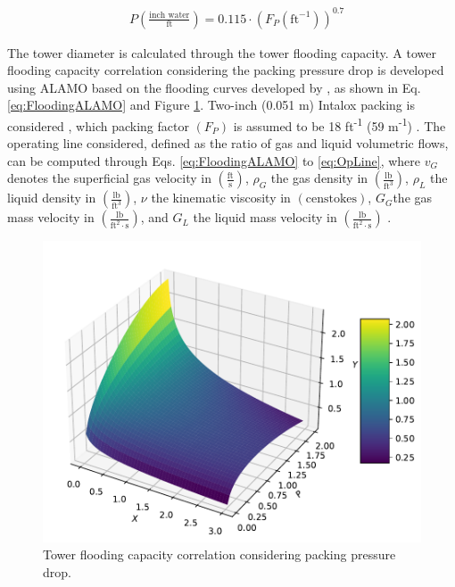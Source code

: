 \begin{refsection}[referencesCh6]

\begin{align}
& P \left(\frac{\text{inch water}}{\text{ft}}\right) = 0.115 \cdot \left( F_{P}  \left(\text{ft}^{-1}\right)\right) ^{0.7} \label{eq:PDrop}
\end{align}

The tower diameter is calculated through the tower flooding capacity. A tower flooding capacity correlation considering the packing pressure drop is developed using ALAMO \citep{wilson2017alamo} based on the flooding curves developed by \citet{strigle1994packed}, as shown in Eq. \ref{eq:FloodingALAMO} and Figure \ref{fig:FloodingALAMO}. Two-inch (0.051 m) Intalox packing is considered \citep{strigle1994packed}, which packing factor $\left(F_P\right)$ is assumed to be 
18 ft\textsuperscript{-1}
(59 m\textsuperscript{-1})
\citep{geankoplis2003transport}. The operating line considered, defined as the ratio of gas and liquid volumetric flows, can be computed through Eqs. \ref{eq:FloodingALAMO} to \ref{eq:OpLine},
where $v_G$ denotes the superficial gas velocity in $\left(\frac{\text{ft}}{\text{s}}\right)$, $\rho_G$ the gas density in $\left(\frac{\text{lb}}{\text{ft}^3}\right) $, $\rho_L$ the liquid density in $ \left(\frac{\text{lb}}{\text{ft}^3}\right) $, $\nu$  the kinematic viscosity in $\left(\text{censtokes}\right)$, $G_G$the gas mass velocity in $\left(\frac{\text{lb}}{\text{ft}^2 \cdot \text{s}}\right)$, and $G_L$ the liquid mass velocity in $\left(\frac{\text{lb}}{\text{ft}^2 \cdot \text{s}}\right) $
\citep{strigle1994packed}.

\begin{figure}[h!]
\centering
	\includegraphics[width=0.72\linewidth, trim={1cm 0cm 0cm 1cm},clip]{gfx/Chapter6/AlamoFlooding.pdf} 
	\caption{Tower flooding capacity correlation considering packing pressure drop.}
	\label{fig:FloodingALAMO}
\end{figure}


\end{refsection}
